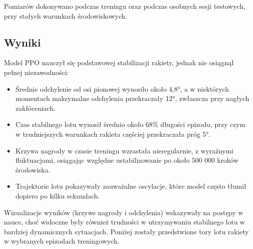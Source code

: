 Pomiarów dokonywano podczas treningu oraz podczas osobnych sesji testowych, przy stałych warunkach środowiskowych.

\subsection{Wyniki}
Model PPO nauczył się podstawowej stabilizacji rakiety, jednak nie osiągnął pełnej niezawodności:

\begin{itemize}
    \item Średnie odchylenie od osi pionowej wynosiło około 4,8°, a w niektórych momentach maksymalne odchylenia przekraczały 12°, zwłaszcza przy nagłych zakłóceniach.
    \item Czas stabilnego lotu wynosił średnio około 68\% długości epizodu, przy czym w trudniejszych warunkach rakieta częściej przekraczała próg 5°.
    \item Krzywa nagrody w czasie treningu wzrastała nieregularnie, z wyraźnymi fluktuacjami, osiągając względne ustabilizowanie po około 500 000 kroków środowiska.
    \item Trajektorie lotu pokazywały zauważalne oscylacje, które model często tłumił dopiero po kilku sekundach.
\end{itemize}

Wizualizacje wyników (krzywe nagrody i odchylenia) wskazywały na postępy w nauce, choć widoczne były również trudności w utrzymywaniu stabilnego lotu w bardziej dynamicznych sytuacjach. Poniżej zostały przedstwione tory lotu rakiety w wybranych epizodach treningowych.

